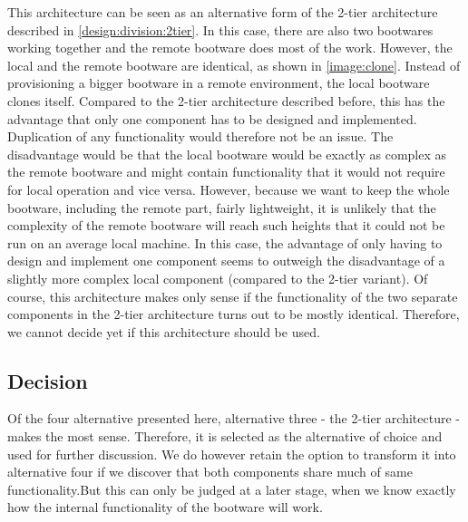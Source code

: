 This architecture can be seen as an alternative form of the 2-tier architecture described in \autoref{design:division:2tier}.
In this case, there are also two bootwares working together and the remote bootware does most of the work.
However, the local and the remote bootware are identical, as shown in \autoref{image:clone}.
Instead of provisioning a bigger bootware in a remote environment, the local bootware clones itself.
Compared to the 2-tier architecture described before, this has the advantage that only one component has to be designed and implemented.
Duplication of any functionality would therefore not be an issue.
The disadvantage would be that the local bootware would be exactly as complex as the remote bootware and might contain functionality that it would not require for local operation and vice versa.
However, because we want to keep the whole bootware, including the remote part, fairly lightweight, it is unlikely that the complexity of the remote bootware will reach such heights that it could not be run on an average local machine.
In this case, the advantage of only having to design and implement one component seems to outweigh the disadvantage of a slightly more complex local component (compared to the 2-tier variant).
Of course, this architecture makes only sense if the functionality of the two separate components in the 2-tier architecture turns out to be mostly identical.
Therefore, we cannot decide yet if this architecture should be used.

\subsection{Decision}

Of the four alternative presented here, alternative three - the 2-tier architecture - makes the most sense.
Therefore, it is selected as the alternative of choice and used for further discussion.
We do however retain the option to transform it into alternative four if we discover that both components share much of same functionality.But this can only be judged at a later stage, when we know exactly how the internal functionality of the bootware will work.
